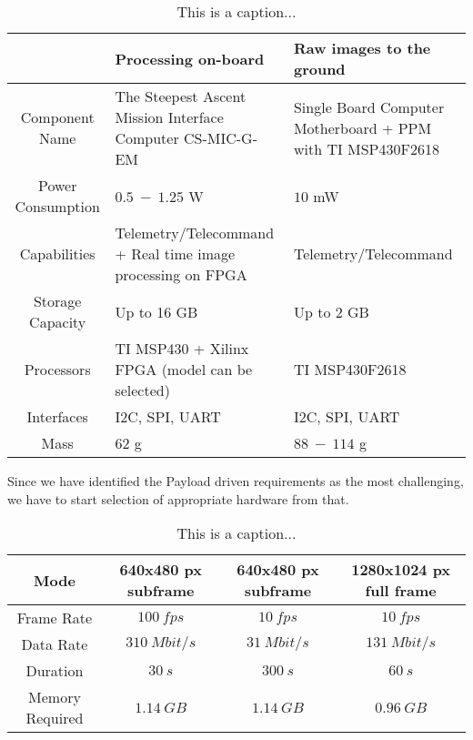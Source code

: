 \documentclass[12pt]{article}
\begin{document}
\begin{table}[ht]\label{table:avionics_hardware_options}
\caption{This is a caption...}
\begin{center}
    \begin{tabular}{| c || p{6cm} | p{6cm} |} \hline
     &	Processing on-board & Raw images to the ground \\ \hline \hline
    Component Name & The Steepest Ascent Mission Interface Computer CS-MIC-G-EM & Single Board Computer Motherboard + PPM with TI MSP430F2618 \\ \hline
    Power Consumption & $0.5\ -\ 1.25$ W & $10$ mW \\ \hline
    Capabilities & Telemetry/Telecommand + Real time image processing on FPGA & Telemetry/Telecommand\\ \hline
    Storage Capacity & Up to 16 GB & Up to 2 GB \\ \hline
    Processors & TI MSP430  + Xilinx FPGA (model can be selected) & TI MSP430F2618 \\ \hline
    Interfaces & I2C, SPI, UART & I2C, SPI, UART \\ \hline
    Mass & $62$ g & $88\ -\ 114$ g \\ \hline 
    \end{tabular}
\end{center}
\end{table}

Since we have identified the Payload driven requirements as the most challenging, we have to start selection of appropriate hardware from that.

\begin{table}[ht]\label{table:avionics_modes}
\caption{This is a caption...}
\begin{center}
    \begin{tabular}{| c || c | c | c |} \hline
    	Mode & 640x480 px subframe &  640x480 px subframe & 1280x1024 px  full frame \\ \hline \hline
    Frame Rate & $100\ fps$ & $10\ fps$ & $10\ fps$ \\
    Data Rate & $310\ Mbit/s$ & $31\ Mbit/s$ & $131\ Mbit/s$ \\
    Duration & $30\ s$ & $300\ s$ & $60\ s$ \\
    Memory Required & $1.14\ GB$ & $1.14\ GB$ & $0.96\ GB$ \\ \hline 
    \end{tabular}
\end{center}
\end{table}
\end{document}
